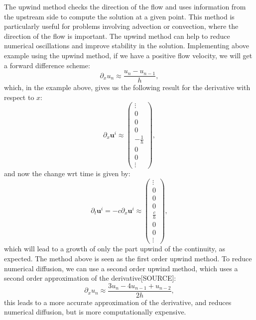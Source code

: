 The upwind method checks the direction of the flow and uses information from the upstream side to compute the solution at a given point. This method is particularly useful for problems involving advection or convection, where the direction of the flow is important. The upwind method can help to reduce numerical oscillations and improve stability in the solution. Implementing above example using the upwind method, if we have a positive flow velocity, we will get a forward difference scheme:
\begin{equation*}
    \partial_x u_n \approx \frac{u_{n} - u_{n-1}}{h},
\end{equation*}
which, in the example above, gives us the following result for the derivative with respect to $x$:
\begin{equation*}
    \partial_x \mathbf{u}^i \approx \begin{pmatrix}
        \vdots \\ 0 \\ 0 \\ 0 \\ -\frac{1}{h} \\ 0 \\ 0 \\  \vdots
    \end{pmatrix},
\end{equation*}
and now the change wrt time is given by:
\begin{equation*}
    \partial_t \mathbf{u}^i = -c \partial_x \mathbf{u}^i \approx \begin{pmatrix}
        \vdots \\ 0 \\ 0 \\ 0 \\ \frac{c}{h} \\ 0 \\ 0 \\ \vdots
    \end{pmatrix},
\end{equation*}
which will lead to a growth of only the part upwind of the continuity, as expected. The method above is seen as the first order upwind method. To reduce numerical diffusion, we can use a second order upwind method, which uses a second order approximation of the derivative[SOURCE]:
\begin{equation*}
    \partial_x u_n \approx \frac{3u_n - 4u_{n-1} + u_{n-2}}{2h},
\end{equation*}
this leads to a more accurate approximation of the derivative, and reduces numerical diffusion, but is more computationally expensive.

